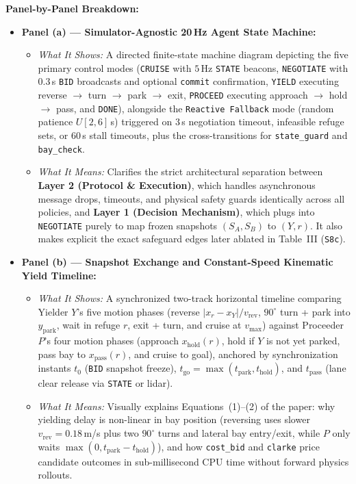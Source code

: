 \documentclass[10pt,a4paper]{article}
\begin{document}
\textbf{Panel-by-Panel Breakdown:}
\begin{itemize}
  \item \textbf{Panel (a) --- Simulator-Agnostic 20\,Hz Agent State Machine:}
  \begin{itemize}
    \item \emph{What It Shows:} A directed finite-state machine diagram depicting the five primary control modes (\texttt{CRUISE} with $5$\,Hz \texttt{STATE} beacons, \texttt{NEGOTIATE} with $0.3$\,s \texttt{BID} broadcasts and optional \texttt{commit} confirmation, \texttt{YIELD} executing reverse $\to$ turn $\to$ park $\to$ exit, \texttt{PROCEED} executing approach $\to$ hold $\to$ pass, and \texttt{DONE}), alongside the \texttt{Reactive Fallback} mode (random patience $U[2,6]$\,s) triggered on $3$\,s negotiation timeout, infeasible refuge sets, or $60$\,s stall timeouts, plus the cross-transitions for \texttt{state\_guard} and \texttt{bay\_check}.
    \item \emph{What It Means:} Clarifies the strict architectural separation between \textbf{Layer 2 (Protocol \& Execution)}, which handles asynchronous message drops, timeouts, and physical safety guards identically across all policies, and \textbf{Layer 1 (Decision Mechanism)}, which plugs into \texttt{NEGOTIATE} purely to map frozen snapshots $(S_A,S_B)$ to $(Y, r)$. It also makes explicit the exact safeguard edges later ablated in Table~III (\texttt{S8c}).
  \end{itemize}
  \item \textbf{Panel (b) --- Snapshot Exchange and Constant-Speed Kinematic Yield Timeline:}
  \begin{itemize}
    \item \emph{What It Shows:} A synchronized two-track horizontal timeline comparing Yielder $Y$'s five motion phases (reverse $|x_r-x_Y|/v_{\mathrm{rev}}$, $90^\circ$ turn + park into $y_{\mathrm{park}}$, wait in refuge $r$, exit + turn, and cruise at $v_{\max}$) against Proceeder $P$'s four motion phases (approach $x_{\mathrm{hold}}(r)$, hold if $Y$ is not yet parked, pass bay to $x_{\mathrm{pass}}(r)$, and cruise to goal), anchored by synchronization instants $t_0$ (\texttt{BID} snapshot freeze), $t_{\mathrm{go}}=\max(t_{\mathrm{park}}, t_{\mathrm{hold}})$, and $t_{\mathrm{pass}}$ (lane clear release via \texttt{STATE} or lidar).
    \item \emph{What It Means:} Visually explains Equations~(1)--(2) of the paper: why yielding delay is non-linear in bay position (reversing uses slower $v_{\mathrm{rev}}=0.18$\,m/s plus two $90^\circ$ turns and lateral bay entry/exit, while $P$ only waits $\max(0, t_{\mathrm{park}}-t_{\mathrm{hold}})$), and how \texttt{cost\_bid} and \texttt{clarke} price candidate outcomes in sub-millisecond CPU time without forward physics rollouts.
  \end{itemize}
\end{itemize}
\end{document}
